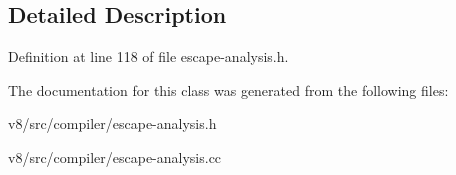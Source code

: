 \subsection{Detailed Description}


Definition at line 118 of file escape-\/analysis.\+h.



The documentation for this class was generated from the following files\+:\begin{DoxyCompactItemize}
\item 
v8/src/compiler/escape-\/analysis.\+h\item 
v8/src/compiler/escape-\/analysis.\+cc\end{DoxyCompactItemize}
